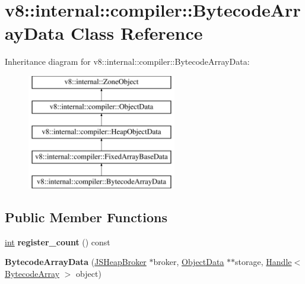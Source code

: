 \hypertarget{classv8_1_1internal_1_1compiler_1_1BytecodeArrayData}{}\section{v8\+:\+:internal\+:\+:compiler\+:\+:Bytecode\+Array\+Data Class Reference}
\label{classv8_1_1internal_1_1compiler_1_1BytecodeArrayData}
Inheritance diagram for v8\+:\+:internal\+:\+:compiler\+:\+:Bytecode\+Array\+Data\+:\begin{figure}[H]
\begin{center}
\leavevmode
\includegraphics[height=5.000000cm]{classv8_1_1internal_1_1compiler_1_1BytecodeArrayData}
\end{center}
\end{figure}
\subsection*{Public Member Functions}
\begin{DoxyCompactItemize}
\item 
\mbox{\label{classv8_1_1internal_1_1compiler_1_1BytecodeArrayData_a107148e268ad18e6aa8691e489db9ff6}} 
\mbox{\hyperlink{classint}{int}} {\bfseries register\+\_\+count} () const
\item 
\mbox{\label{classv8_1_1internal_1_1compiler_1_1BytecodeArrayData_a36adcb9764440a9b90c800edc6754519}} 
{\bfseries Bytecode\+Array\+Data} (\mbox{\hyperlink{classv8_1_1internal_1_1compiler_1_1JSHeapBroker}{J\+S\+Heap\+Broker}} $\ast$broker, \mbox{\hyperlink{classv8_1_1internal_1_1compiler_1_1ObjectData}{Object\+Data}} $\ast$$\ast$storage, \mbox{\hyperlink{classv8_1_1internal_1_1Handle}{Handle}}$<$ \mbox{\hyperlink{classv8_1_1internal_1_1BytecodeArray}{Bytecode\+Array}} $>$ object)
\end{DoxyCompactItemize}
